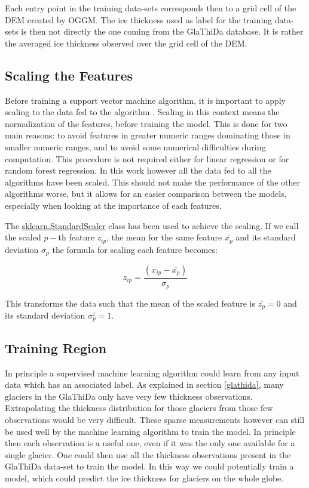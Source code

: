 Each entry point in the training data-sets corresponds then to a grid cell of the DEM created by OGGM. The ice thickness used as label for the training data-sets is then not directly the one coming from the GlaThiDa database. It is rather the averaged ice thickness observed over the grid cell of the DEM.

\subsection{Scaling the Features}
Before training a support vector machine algorithm, it is important to apply scaling to the data fed to the algorithm \citep{ScalingSVM2003}. Scaling in this context means the normalization of the features, before training the model. This is done for two main reasons: to avoid features in greater numeric ranges dominating those in smaller numeric ranges, and to avoid some numerical difficulties during computation. This procedure is not required either for linear regression or for random forest regression. In this work however all the data fed to all the algorithms have been scaled. This should not make the performance of the other algorithms worse, but it allows for an easier comparison between the models, especially when looking at the importance of each features.

The \href{https://scikit-learn.org/stable/modules/generated/sklearn.preprocessing.StandardScaler.html}{sklearn.StandardScaler} class has been used to achieve the scaling. If we call the scaled $p-$th feature $z_{ip}$, the mean for the same feature $\overline{x_p}$ and its standard deviation $\sigma_p$ the formula for scaling each feature becomes:

\begin{equation}\label{eq:scale}
z_{ip} = \frac{(x_{ip} - \overline{x_p})}{\sigma_p}
\end{equation}

This transforms the data such that the mean of the scaled feature is $\overline{z_p}=0$ and its standard deviation $\sigma^z_p=1$.

\subsection{Training Region}\label{alps}
In principle a supervised machine learning algorithm could learn from any input data which has an associated label. As explained in section \ref{glathida}, many glaciers in the GlaThiDa only have very few thickness observations. Extrapolating the thickness distribution for those glaciers from those few observations would be very difficult. These sparse measurements however can still be used well by the machine learning algorithm to train the model. In principle then each observation is a useful one, even if it was the only one available for a single glacier. One could then use all the thickness observations present in the GlaThiDa data-set to train the model. In this way we could potentially train a model, which could predict the ice thickness for glaciers on the whole globe.

